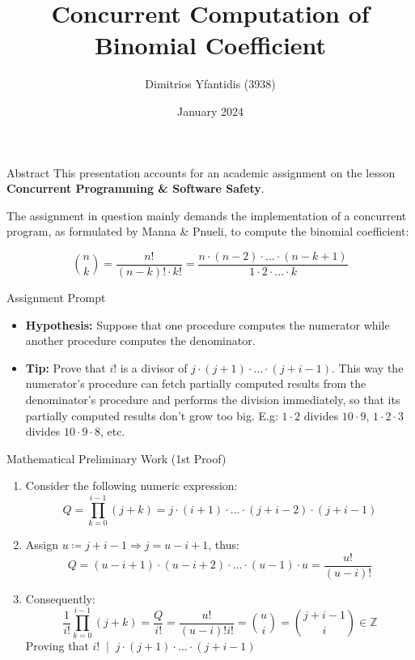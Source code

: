 \documentclass[xcolor=dvipsnames]{beamer}
\title{Concurrent Computation of Binomial Coefficient}
\author{Dimitrios Yfantidis (3938)}
\institute{Aristotle University of Thessaloniki, \\
Faculty of Sciences, Department of Informatics}
\date{January 2024}
\begin{document}
\begin{frame}
\titlepage
{\small
\doclicenseThis
}
\end{frame}

\begin{frame}{Abstract}
    This presentation accounts for an academic assignment on the lesson 
    \textbf{Concurrent Programming \& Software Safety}. 
    
    \pause
    \hfill

    The assignment in question mainly demands the implementation of a concurrent 
    program, as formulated by Manna \& Pnueli, to compute the binomial coefficient:
    
\[
    \binom{n}{k} = \frac{n!}{(n-k)! \cdot k!} = 
    \frac{n \cdot (n-2) \cdot ... \cdot (n-k+1)}{1 \cdot 2 \cdot ... \cdot k}
\]

\end{frame}

\begin{frame}{Assignment Prompt}
    \begin{itemize}
        \item<1-> \textbf{Hypothesis:} Suppose that one procedure computes the numerator while another procedure computes the denominator.
        \item<2-> \textbf{Tip:} 
        Prove that $i!$ is a divisor of $j \cdot (j+1) \cdot ... \cdot (j + i - 1)$. 
        This way the numerator's procedure can fetch partially computed results from 
        the denominator's procedure and performs the division immediately, so that 
        its partially computed results don't grow too big. E.g: $1 \cdot 2$ divides 
        $10 \cdot 9$, $1 \cdot 2 \cdot 3$ divides $10 \cdot 9 \cdot 8$, etc.
    \end{itemize}
\end{frame}

\begin{frame}{Mathematical Preliminary Work (1st Proof)}
	\begin{enumerate}
		\item Consider the following numeric expression:
		\[
			Q = \prod_{k=0}^{i-1}\left(j+k\right) =
			j \cdot (i+1) \cdot ... \cdot (j+i-2) \cdot (j+i-1)
		\]
		\item Assign $u \coloneqq j+i-1 \Rightarrow j = u-i+1$, thus:
		\[
			Q = (u-i+1) \cdot (u-i+2) \cdot ... \cdot (u-1) \cdot u = 
			\frac{u!}{(u - i)!}
		\]
		\item Consequently:
		\[
			\frac{1}{i!} \prod_{k=0}^{i-1}\left(j+k\right) =  
			\frac{Q}{i!} = \frac{u!}{(u-i)!i!} = \binom{u}{i} = 
			\binom{j+i-1}{i} \in \mathbb{Z}
		\]
		Proving that $i! \; \mid \; j \cdot (j+1) \cdot ... \cdot (j + i - 1)$
	\end{enumerate}
\end{frame}
\end{document}

